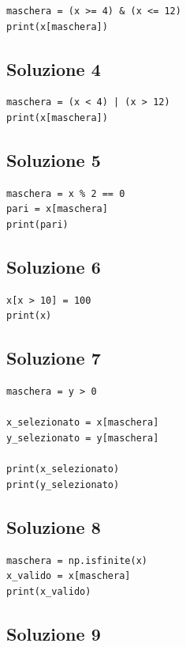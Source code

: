 \documentclass[11pt,a4paper]{book}
\begin{document}
\begin{lstlisting}
maschera = (x >= 4) & (x <= 12)
print(x[maschera])
\end{lstlisting}

\subsection*{Soluzione 4}

\begin{lstlisting}
maschera = (x < 4) | (x > 12)
print(x[maschera])
\end{lstlisting}

\subsection*{Soluzione 5}

\begin{lstlisting}
maschera = x % 2 == 0
pari = x[maschera]
print(pari)
\end{lstlisting}

\subsection*{Soluzione 6}

\begin{lstlisting}
x[x > 10] = 100
print(x)
\end{lstlisting}

\subsection*{Soluzione 7}

\begin{lstlisting}
maschera = y > 0

x_selezionato = x[maschera]
y_selezionato = y[maschera]

print(x_selezionato)
print(y_selezionato)
\end{lstlisting}

\subsection*{Soluzione 8}

\begin{lstlisting}
maschera = np.isfinite(x)
x_valido = x[maschera]
print(x_valido)
\end{lstlisting}

\subsection*{Soluzione 9}
\end{document}
